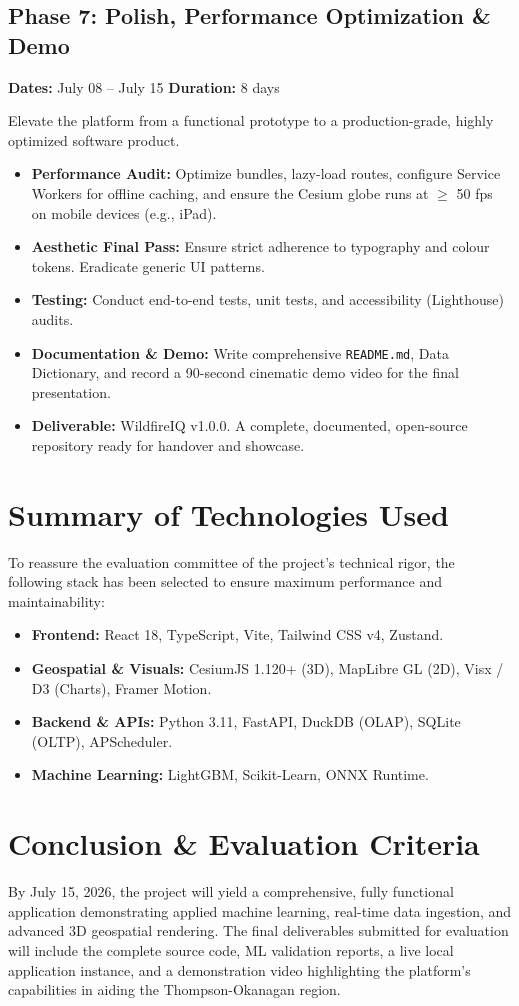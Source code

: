 \documentclass[12pt,letterpaper]{article}
\begin{document}
\subsection*{Phase 7: Polish, Performance Optimization \& Demo}
\textbf{Dates:} July 08 -- July 15 \hfill \textbf{Duration:} 8 days

\begin{goalbox}
Elevate the platform from a functional prototype to a production-grade, highly optimized software product.
\end{goalbox}

\begin{itemize}
    \item \textbf{Performance Audit:} Optimize bundles, lazy-load routes, configure Service Workers for offline caching, and ensure the Cesium globe runs at $\geq$ 50 fps on mobile devices (e.g., iPad).
    \item \textbf{Aesthetic Final Pass:} Ensure strict adherence to typography and colour tokens. Eradicate generic UI patterns.
    \item \textbf{Testing:} Conduct end-to-end tests, unit tests, and accessibility (Lighthouse) audits.
    \item \textbf{Documentation \& Demo:} Write comprehensive \texttt{README.md}, Data Dictionary, and record a 90-second cinematic demo video for the final presentation.
    \item \textbf{Deliverable:} WildfireIQ v1.0.0. A complete, documented, open-source repository ready for handover and showcase.
\end{itemize}

\section{Summary of Technologies Used}
To reassure the evaluation committee of the project's technical rigor, the following stack has been selected to ensure maximum performance and maintainability:
\begin{itemize}
    \item \textbf{Frontend:} React 18, TypeScript, Vite, Tailwind CSS v4, Zustand.
    \item \textbf{Geospatial \& Visuals:} CesiumJS 1.120+ (3D), MapLibre GL (2D), Visx / D3 (Charts), Framer Motion.
    \item \textbf{Backend \& APIs:} Python 3.11, FastAPI, DuckDB (OLAP), SQLite (OLTP), APScheduler.
    \item \textbf{Machine Learning:} LightGBM, Scikit-Learn, ONNX Runtime.
\end{itemize}

\section{Conclusion \& Evaluation Criteria}
By July 15, 2026, the project will yield a comprehensive, fully functional application demonstrating applied machine learning, real-time data ingestion, and advanced 3D geospatial rendering. The final deliverables submitted for evaluation will include the complete source code, ML validation reports, a live local application instance, and a demonstration video highlighting the platform's capabilities in aiding the Thompson-Okanagan region.
\end{document}
